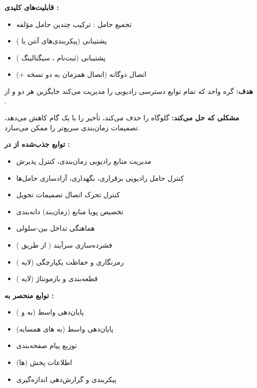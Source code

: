 \textbf{قابلیت‌های کلیدی :}

\begin{itemize}
\tightlist
\item
  تجمیع حامل : ترکیب چندین حامل مؤلفه
\item
  پشتیبانی  (پیکربندی‌های آنتن  یا )
\item
  پشتیبانی  (ثبت‌نام ، سیگنالینگ )
\item
  اتصال دوگانه (اتصال همزمان به دو   نسخه +)
\end{itemize}


\textbf{هدف:} گره واحد  که تمام توابع دسترسی رادیویی را مدیریت می‌کند  جایگزین هر دو  و  از .

\textbf{مشکلی که حل می‌کند:} گلوگاه  را حذف می‌کند، تأخیر را با یک گام کاهش می‌دهد، تصمیمات زمان‌بندی سریع‌تر را ممکن می‌سازد.

\textbf{توابع جذب‌شده از  در :}

\begin{itemize}
\tightlist
\item
  مدیریت منابع رادیویی   زمان‌بندی، کنترل پذیرش
\item
  کنترل حامل رادیویی  برقراری، نگهداری، آزادسازی حامل‌ها
\item
  کنترل تحرک اتصال  تصمیمات تحویل
\item
  تخصیص پویا منابع (زمان‌بند)  دانه‌بندی 
\item
  هماهنگی تداخل بین-سلولی 
\item
  فشرده‌سازی سرآیند ( از طریق )
\item
  رمزنگاری و حفاظت یکپارچگی (لایه )
\item
  قطعه‌بندی و بازمونتاژ (لایه )
\end{itemize}

\textbf{توابع منحصر به :}

\begin{itemize}
\tightlist
\item
  پایان‌دهی واسط  (به  و )
\item
  پایان‌دهی واسط  (به های همسایه)
\item
  توزیع پیام صفحه‌بندی
\item
  اطلاعات پخش (ها)
\item
  پیکربندی و گزارش‌دهی اندازه‌گیری
\end{itemize}

